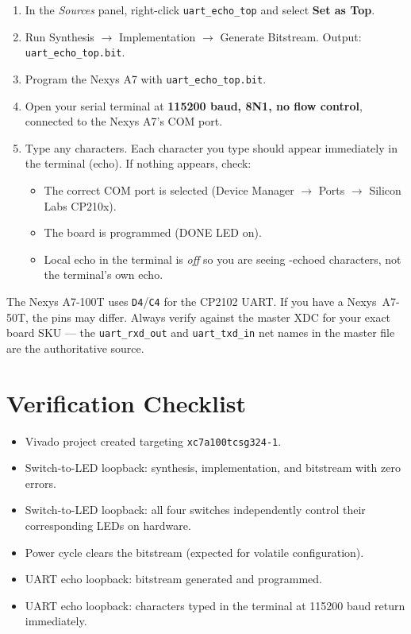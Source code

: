 \documentclass[11pt,letterpaper]{article}
\begin{document}
\begin{enumerate}[leftmargin=2em,start=2]
	\item In the \textit{Sources} panel, right-click \texttt{uart\_echo\_top} and select \textbf{Set as Top}.
	\item Run Synthesis $\to$ Implementation $\to$ Generate Bitstream. Output: \texttt{uart\_echo\_top.bit}.
	\item Program the Nexys A7 with \texttt{uart\_echo\_top.bit}.
	\item Open your serial terminal at \textbf{115200 baud, 8N1, no flow control}, connected to the Nexys A7's COM port.
	\item Type any characters. Each character you type should appear immediately in the terminal (echo). If nothing appears, check:
	\begin{itemize}[leftmargin=2em]
		\item The correct COM port is selected (Device Manager $\to$ Ports $\to$ Silicon Labs CP210x).
		\item The board is programmed (DONE \mbox{LED} on).
		\item Local echo in the terminal is \emph{off} so you are seeing \FPGA{}-echoed characters, not the terminal's own echo.
	\end{itemize}
\end{enumerate}

\begin{tcolorbox}[warning={Pin numbers vary by board revision}]
	The Nexys A7-100T uses \texttt{D4}/\texttt{C4} for the CP2102 \mbox{UART}. If you have a Nexys~A7-50T, the pins may differ. Always verify against the master XDC for your exact board SKU --- the \texttt{uart\_rxd\_out} and \texttt{uart\_txd\_in} net names in the master file are the authoritative source.
\end{tcolorbox}

\newpage
\section{Verification Checklist}
\begin{itemize}[leftmargin=2em]
	\item[$\square$] Vivado project created targeting \texttt{xc7a100tcsg324-1}.
	\item[$\square$] Switch-to-LED loopback: synthesis, implementation, and bitstream with zero errors.
	\item[$\square$] Switch-to-LED loopback: all four switches independently control their corresponding LEDs on hardware.
	\item[$\square$] Power cycle clears the bitstream (expected for volatile configuration).
	\item[$\square$] \mbox{UART} echo loopback: bitstream generated and programmed.
	\item[$\square$] \mbox{UART} echo loopback: characters typed in the terminal at 115200 baud return immediately.
\end{itemize}
\end{document}
